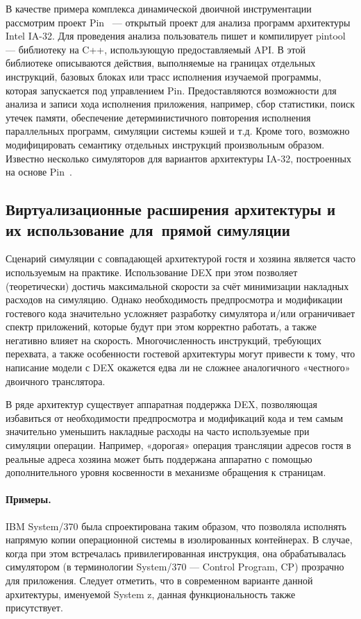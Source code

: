 В качестве примера комплекса динамической двоичной инструментации рассмотрим проект Pin~\cite{pin} — открытый проект для анализа программ архитектуры Intel IA-32. Для проведения анализа пользователь пишет и компилирует pintool — библиотеку на C++, использующую предоставляемый API. В этой библиотеке описываются действия, выполняемые на границах отдельных инструкций, базовых блоках или трасс исполнения изучаемой программы, которая запускается под управлением Pin. Предоставляются возможности для анализа и записи хода исполнения приложения, например, сбор статистики, поиск утечек памяти, обеспечение детерминистичного повторения исполнения параллельных программ, симуляции системы кэшей и т.д. Кроме того, возможно модифицировать семантику отдельных инструкций произвольным образом.  Известно несколько симуляторов для вариантов архитектуры IA-32, построенных на основе Pin~\cite{intel-sde, graphite2010, cmpsim, carlson2011etloafsaapms}.

\subsection[Виртуализационные расширения]{Виртуализационные расширения архитектуры и их использование для~прямой симуляции}

Сценарий симуляции с совпадающей архитектурой гостя и хозяина является часто используемым на практике. Использование DEX при этом позволяет (теоретически) достичь максимальной скорости за счёт минимизации накладных расходов на симуляцию. Однако необходимость предпросмотра и модификации гостевого кода значительно усложняет разработку симулятора и/или  ограничивает спектр приложений, которые будут при этом корректно работать, а также негативно влияет на скорость. Многочисленность инструкций, требующих перехвата, а также особенности гостевой архитектуры могут привести к тому, что написание модели с DEX окажется едва ли не сложнее аналогичного «честного» двоичного транслятора.

В ряде архитектур существует аппаратная поддержка DEX, позволяющая избавиться от необходимости предпросмотра и модификаций кода и тем самым значительно уменьшить накладные расходы на часто используемые при симуляции операции. Например, «дорогая» операция трансляции адресов гостя в реальные адреса хозяина может быть поддержана аппаратно с помощью дополнительного уровня косвенности в механизме обращения к страницам.

\paragraph{Примеры.} IBM System/370 была спроектирована таким образом, что позволяла исполнять напрямую копии операционной системы в изолированных контейнерах. В случае, когда при этом встречалась привилегированная инструкция, она обрабатывалась симулятором (в терминологии System/370 — Control Program, CP) прозрачно для приложения. Следует отметить, что в современном варианте данной архитектуры, именуемой System z, данная функциональность также присутствует.

